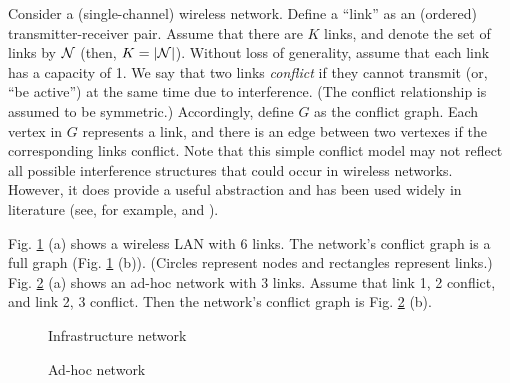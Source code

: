 \documentclass{IEEEtran}
\begin{document}
Consider a (single-channel) wireless network. Define a {}``link''
as an (ordered) transmitter-receiver pair. Assume that there are $K$
links, and denote the set of links by ${\cal N}$ (then, $K=|{\cal N}|$).
Without loss of generality, assume that each link has a capacity of
1. We say that two links \emph{conflict} if they cannot transmit (or,
{}``be active'') at the same time due to interference. (The conflict
relationship is assumed to be symmetric.) Accordingly, define $G$
as the conflict graph. Each vertex in $G$ represents a link, and
there is an edge between two vertexes if the corresponding links conflict.
Note that this simple conflict model may not reflect all possible
interference structures that could occur in wireless networks. However,
it does provide a useful abstraction and has been used widely in literature
(see, for example, \cite{Kar} and \cite{tutorial}). \begin{comment}
Also, it is general enough to be used in other resource sharing problems.
An example is provided in the next section.
\end{comment}
{} \begin{comment}
Further assume that there is no loss of packets due to channel fading.
\end{comment}
{}

Fig. \ref{fig:WLAN} (a) shows a wireless LAN with 6 links. The network's
conflict graph is a full graph (Fig. \ref{fig:WLAN} (b)). (Circles
represent nodes and rectangles represent links.) Fig. \ref{fig:Ad-hoc}
(a) shows an ad-hoc network with 3 links. Assume that link 1, 2 conflict,
and link 2, 3 conflict. Then the network's conflict graph is Fig.
\ref{fig:Ad-hoc} (b). \begin{figure}
\begin{centering}
 
\par\end{centering}

\caption{\label{fig:WLAN}Infrastructure network}

\end{figure}
\begin{figure}
\begin{centering}
 
\par\end{centering}

\caption{\label{fig:Ad-hoc}Ad-hoc network}

\end{figure}
\medskip{}
\end{document}
